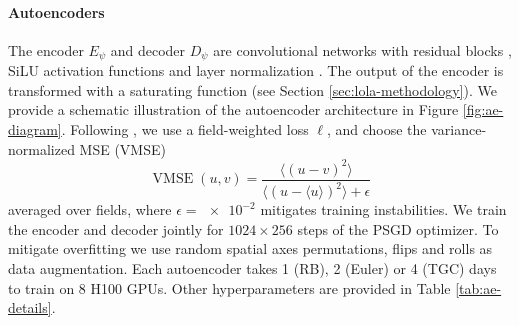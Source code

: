 \begin{subappendices}
\paragraph{Autoencoders} The encoder $E_\psi$ and decoder $D_\psi$ are convolutional networks with residual blocks \cite{he2016deep}, SiLU \cite{elfwing2018sigmoidweighted} activation functions and layer normalization \cite{ba2016layer}. The output of the encoder is transformed with a saturating function (see Section \ref{sec:lola-methodology}). We provide a schematic illustration of the autoencoder architecture in Figure \ref{fig:ae-diagram}. Following \textcite{mccabe2024multiple}, we use a field-weighted loss $\ell$, and choose the variance-normalized MSE (VMSE)
\begin{equation} \label{eq:lola-vmse}
    \operatorname{VMSE}(u, v) = \frac{\big\langle (u - v)^2 \big\rangle}{\big\langle (u - \langle u \rangle)^2 \big\rangle + \epsilon}
\end{equation}
averaged over fields, where $\epsilon = \num{e-2}$ mitigates training instabilities. We train the encoder and decoder jointly for $1024 \times 256$ steps of the PSGD \cite{li2018preconditioned} optimizer. To mitigate overfitting we use random spatial axes permutations, flips and rolls as data augmentation. Each autoencoder takes 1 (RB), 2 (Euler) or 4 (TGC) days to train on 8 H100 GPUs. Other hyperparameters are provided in Table \ref{tab:ae-details}.


\end{subappendices}
